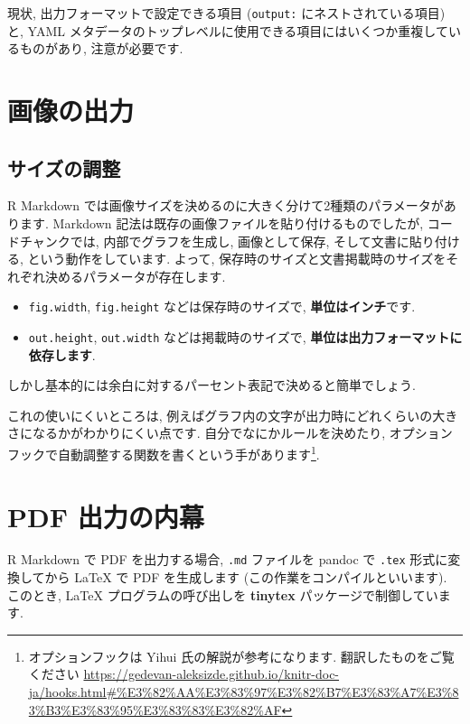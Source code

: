 \documentclass[
]{ltjsarticle}
\begin{document}
現状, 出力フォーマットで設定できる項目 (\texttt{output:} にネストされている項目) と, YAML メタデータのトップレベルに使用できる項目にはいくつか重複しているものがあり, 注意が必要です.

\hypertarget{ux753bux50cfux306eux51faux529b}{%
\section{画像の出力}\label{ux753bux50cfux306eux51faux529b}}

\hypertarget{ux30b5ux30a4ux30baux306eux8abfux6574}{%
\subsection{サイズの調整}\label{ux30b5ux30a4ux30baux306eux8abfux6574}}

R Markdown では画像サイズを決めるのに大きく分けて2種類のパラメータがあります. Markdown 記法は既存の画像ファイルを貼り付けるものでしたが, コードチャンクでは, 内部でグラフを生成し, 画像として保存, そして文書に貼り付ける, という動作をしています. よって, 保存時のサイズと文書掲載時のサイズをそれぞれ決めるパラメータが存在します.

\begin{itemize}
\item
  \texttt{fig.width}, \texttt{fig.height} などは保存時のサイズで, \textbf{単位はインチ}です.
\item
  \texttt{out.height}, \texttt{out.width} などは掲載時のサイズで, \textbf{単位は出力フォーマットに依存します}.
\end{itemize}

しかし基本的には余白に対するパーセント表記で決めると簡単でしょう.

これの使いにくいところは, 例えばグラフ内の文字が出力時にどれくらいの大きさになるかがわかりにくい点です. 自分でなにかルールを決めたり, オプションフックで自動調整する関数を書くという手があります\footnote{オプションフックは Yihui 氏の解説が参考になります. 翻訳したものをご覧ください \url{https://gedevan-aleksizde.github.io/knitr-doc-ja/hooks.html\#\%E3\%82\%AA\%E3\%83\%97\%E3\%82\%B7\%E3\%83\%A7\%E3\%83\%B3\%E3\%83\%95\%E3\%83\%83\%E3\%82\%AF}}.

\hypertarget{pdf-intro}{%
\section{PDF 出力の内幕}\label{pdf-intro}}

R Markdown で PDF を出力する場合, \texttt{.md} ファイルを pandoc で \texttt{.tex} 形式に変換してから LaTeX で PDF を生成します (この作業をコンパイルといいます). このとき, LaTeX プログラムの呼び出しを \textbf{tinytex} パッケージで制御しています.
\end{document}

